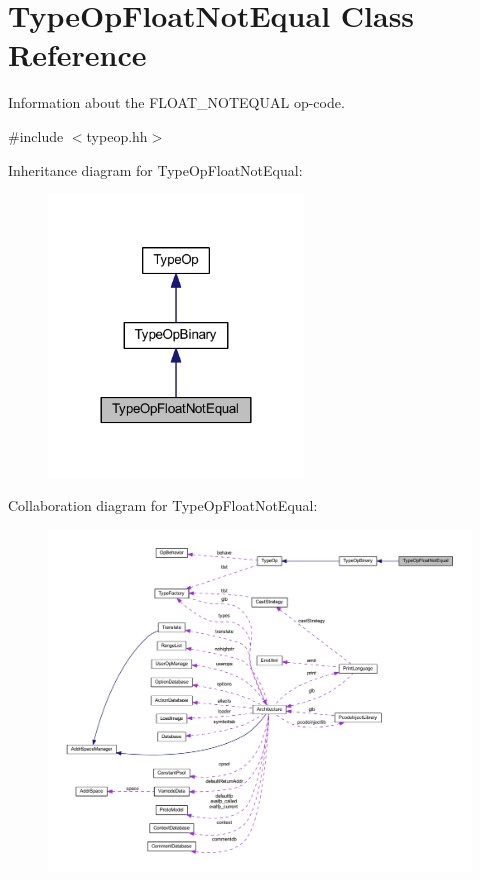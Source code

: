 \hypertarget{class_type_op_float_not_equal}{}\section{Type\+Op\+Float\+Not\+Equal Class Reference}
\label{class_type_op_float_not_equal}


Information about the F\+L\+O\+A\+T\+\_\+\+N\+O\+T\+E\+Q\+U\+AL op-\/code.  




{\ttfamily \#include $<$typeop.\+hh$>$}



Inheritance diagram for Type\+Op\+Float\+Not\+Equal\+:
\nopagebreak
\begin{figure}[H]
\begin{center}
\leavevmode
\includegraphics[width=192pt]{class_type_op_float_not_equal__inherit__graph}
\end{center}
\end{figure}


Collaboration diagram for Type\+Op\+Float\+Not\+Equal\+:
\nopagebreak
\begin{figure}[H]
\begin{center}
\leavevmode
\includegraphics[width=350pt]{class_type_op_float_not_equal__coll__graph}
\end{center}
\end{figure}
